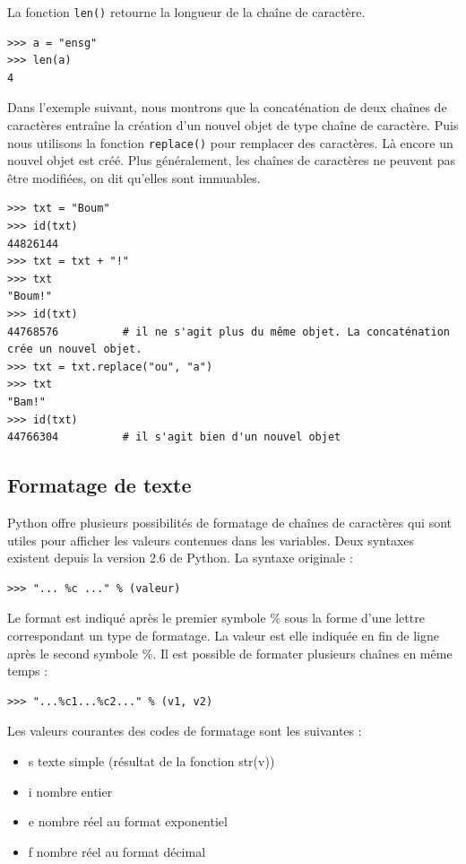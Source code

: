 \documentclass[12pt, a4paper]{article}
\begin{document}
La fonction \lstinline{len()} retourne la longueur de la chaîne de caractère.
\begin{lstlisting}
>>> a = "ensg"
>>> len(a)
4
\end{lstlisting}

Dans l'exemple suivant, nous montrons que la concaténation de deux chaînes de caractères entraîne la création d'un nouvel objet de type chaîne de caractère. Puis nous utilisons la fonction \lstinline{replace()} pour remplacer des caractères. Là encore un nouvel objet est créé. Plus généralement, les chaînes de caractères ne peuvent pas être modifiées, on dit qu'elles sont immuables.
\begin{lstlisting}
>>> txt = "Boum"
>>> id(txt)
44826144
>>> txt = txt + "!"
>>> txt
"Boum!"
>>> id(txt)
44768576          # il ne s'agit plus du même objet. La concaténation crée un nouvel objet.
>>> txt = txt.replace("ou", "a")
>>> txt
"Bam!"
>>> id(txt)
44766304          # il s'agit bien d'un nouvel objet
\end{lstlisting}


\subsection{Formatage de texte}
Python offre plusieurs possibilités de formatage de chaînes de caractères qui sont utiles pour afficher les valeurs contenues dans les variables. Deux syntaxes existent depuis la version 2.6 de Python. La syntaxe originale :
\begin{lstlisting}
>>> "... %c ..." % (valeur)
\end{lstlisting}

Le format est indiqué après le premier symbole \% sous la forme d'une lettre correspondant un type de formatage. La valeur est elle indiquée en fin de ligne après le second symbole \%. Il est possible de formater plusieurs chaînes en même temps : 
\begin{lstlisting}
>>> "...%c1...%c2..." % (v1, v2)
\end{lstlisting}

Les valeurs courantes des codes de formatage sont les suivantes :
\begin{itemize}
	\item s texte simple (résultat de la fonction str(v))
	\item i nombre entier
	\item e nombre réel au format exponentiel
	\item f nombre réel au format décimal
\end{itemize}
\end{document}
